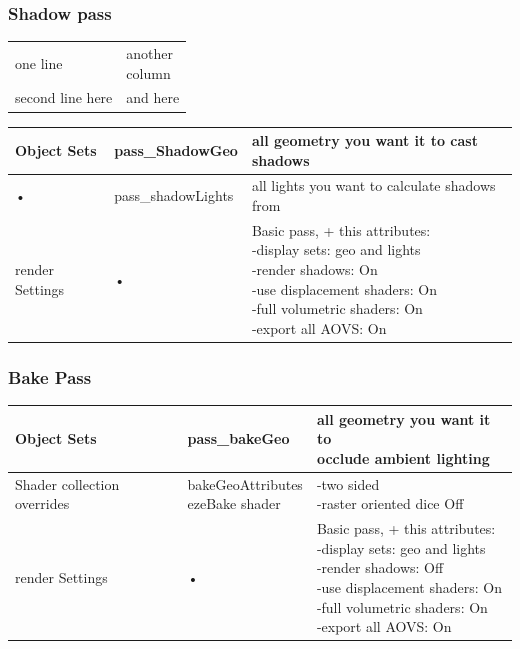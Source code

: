 \documentclass[final,letterpaper,twoside,12pt]{report}
\begin{document}
\subsubsection {Shadow pass}
\begin{tabular}{ll}
one line& \parbox[t]{5cm}{another\\column}\\
second line here& and here
\end{tabular}

\footnotesize
\begin{tabular}{|l|l|l|}
\hline 
Object Sets & pass\_ShadowGeo & all geometry you want it to cast shadows  \\ 
\hline 
• & pass\_shadowLights & all lights you want to calculate shadows from \\ 
\hline 
render Settings & • & 
\parbox[t]{5cm}{Basic pass, + this attributes:\\
-display sets: geo and lights\\
-render shadows: On\\
-use displacement shaders: On\\
-full volumetric shaders: On\\
-export all AOVS: On\\}
\\ 
\hline 
\end{tabular} 

\smallskip
\subsubsection {Bake Pass}
\footnotesize
\begin{tabular}{|l|l|l|}
\hline 
Object Sets & pass\_bakeGeo & \parbox[t]{5cm}{all geometry you want it to\\
occlude ambient lighting\\}\\
\hline
Shader collection overrides & \parbox[t]{5cm}{bakeGeoAttributes\\
ezeBake shader}
 & \parbox[t]{5cm}{-two sided\\
-raster oriented dice Off}\\
\hline 
render Settings & • & 
\parbox[t]{5cm}{Basic pass, + this attributes:\\
-display sets: geo and lights\\
-render shadows: Off\\
-use displacement shaders: On\\
-full volumetric shaders: On\\
-export all AOVS: On\\}
\\ 
\hline 
\end{tabular} 
\smallskip
\end{document}
